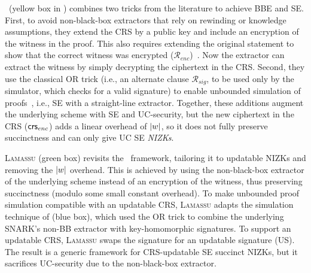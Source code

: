 \COCO\ (yellow box in ) combines two tricks from the literature to achieve BBE and SE. First, to avoid non-black-box extractors that rely on rewinding or knowledge assumptions, they extend the CRS by a public key and include an encryption of the witness in the proof. This also requires extending the original statement to show that the correct witness was encrypted ($\mathcal{R}_{enc}$)~\cite{FOCS:DeSPer92}. Now the extractor can extract the witness by simply decrypting the ciphertext in the CRS. Second, they use the classical OR trick (i.e., an alternate clause $\mathcal{R}_{sig}$, to be used only by the simulator, which checks for a valid signature) to enable unbounded simulation of proofs~\cite{C:DDOPS01}, i.e., SE with a straight-line extractor. Together, these additions augment the underlying scheme with SE and UC-security, but the new ciphertext in the CRS ($\mathsf{crs}_{enc}$) adds a linear overhead of $\lvert w \rvert$, so it does not fully preserve succinctness and can only give UC SE \emph{NIZKs}.

\textsc{Lamassu} (green box) revisits the \COCO\ framework, tailoring it to updatable NIZKs and removing the $\lvert w \rvert$ overhead. This is achieved by using the non-black-box extractor of the underlying scheme instead of an encryption of the witness, thus preserving succinctness (modulo some small constant overhead). To make unbounded proof simulation compatible with an updatable CRS, \textsc{Lamassu} adapts the simulation technique of \cite{DCC:DerSla19} (blue box), which used the OR trick to combine the underlying SNARK's non-BB extractor with key-homomorphic signatures. To support an updatable CRS, \textsc{Lamassu} swaps the signature for an updatable signature (US). The result is a generic framework for CRS-updatable SE succinct NIZKs, but it sacrifices UC-security due to the non-black-box extractor.

